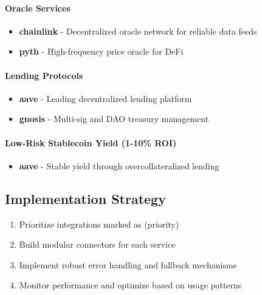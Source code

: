 \documentclass{article}
\begin{document}
\paragraph{Oracle Services}
\begin{itemize}[leftmargin=*]
    \item \textbf{chainlink} - Decentralized oracle network for reliable data feeds
    \item \textbf{pyth} - High-frequency price oracle for DeFi
\end{itemize}

\paragraph{Lending Protocols}
\begin{itemize}[leftmargin=*]
    \item \textbf{aave} - Leading decentralized lending platform
    \item \textbf{gnosis} - Multi-sig and DAO treasury management
\end{itemize}

\paragraph{Low-Risk Stablecoin Yield (1-10\% ROI)}
\begin{itemize}[leftmargin=*]
    \item \textbf{aave} - Stable yield through overcollateralized lending
\end{itemize}

\subsection{Implementation Strategy}
\begin{enumerate}[leftmargin=*]
    \item Prioritize integrations marked as (priority)
    \item Build modular connectors for each service
    \item Implement robust error handling and fallback mechanisms
    \item Monitor performance and optimize based on usage patterns
\end{enumerate}
\end{document}
